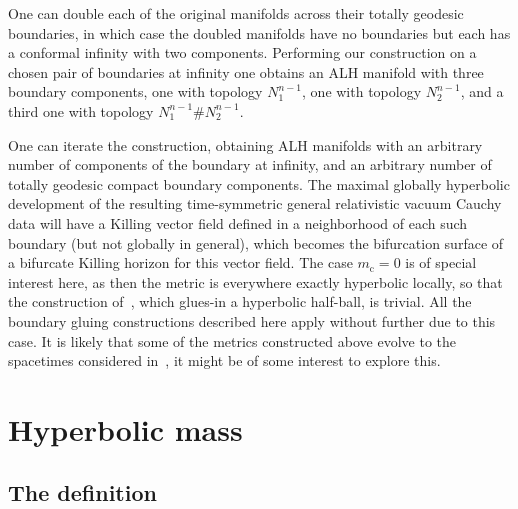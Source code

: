 \documentclass[a4paper,10pt]{article}
\newcommand{\Nkone}{\red{N^{n-1}_1}}
\newcommand{\Nktwo}{\red{N^{n-1}_2}}
\newcommand{\red}[1]{{\color{red}#1}}
\newcommand{\mc}{\red{m_{\mathrm c}}}
\renewcommand{\red}[1]{#1}%
\begin{document}
      One can double each of the original manifolds across their totally geodesic
      boundaries, in which case the doubled manifolds have no boundaries but each
      has a conformal infinity with two components. Performing our construction on
      a chosen pair of boundaries at infinity one obtains an ALH manifold with
      three boundary components, one with topology $\Nkone $, one with topology
      $\Nktwo $, and a third one with topology  $\Nkone \#\Nktwo $.

      One can iterate the construction, obtaining ALH manifolds with an arbitrary
      number of components of the boundary at infinity, and an  arbitrary number
      of totally geodesic compact
      boundary components. The maximal globally hyperbolic development of the resulting time-symmetric general relativistic vacuum Cauchy data will have a Killing vector field defined in a neighborhood of each such boundary (but not globally in general), which becomes the bifurcation surface of a bifurcate Killing horizon for this vector field.
      The case $\mc=0$ is of special interest here, as then the metric is everywhere exactly  hyperbolic locally,  so
      that the construction of~\cite{ChDelayAH}, which glues-in a hyperbolic
      half-ball, is trivial.
      All the boundary gluing constructions described here apply without further due to this case.
      It is likely that some of the metrics constructed above evolve to the spacetimes considered in~\cite{Peldan1,Peldan2}, it might be of some interest to  explore this.


      \section{Hyperbolic mass}
      \label{s3VII21.1}


     \subsection{The definition}
      \label{ss5VII21.3}
\end{document}
